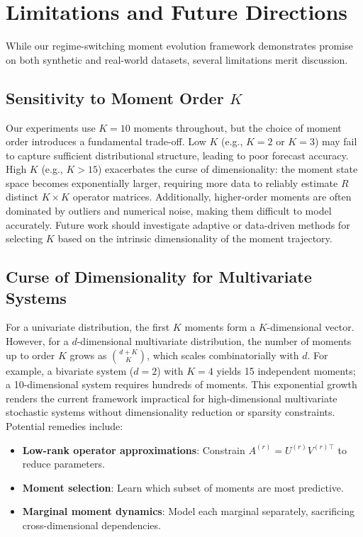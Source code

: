 \documentclass[journal, onecolumn]{IEEEtran}
\begin{document}
\section{Limitations and Future Directions}
\label{sec:limitations}

While our regime-switching moment evolution framework demonstrates promise on both synthetic and real-world datasets, several limitations merit discussion.

\subsection{Sensitivity to Moment Order $K$}

Our experiments use $K=10$ moments throughout, but the choice of moment order introduces a fundamental trade-off. Low $K$ (e.g., $K=2$ or $K=3$) may fail to capture sufficient distributional structure, leading to poor forecast accuracy. High $K$ (e.g., $K > 15$) exacerbates the curse of dimensionality: the moment state space becomes exponentially larger, requiring more data to reliably estimate $R$ distinct $K \times K$ operator matrices. Additionally, higher-order moments are often dominated by outliers and numerical noise, making them difficult to model accurately. Future work should investigate adaptive or data-driven methods for selecting $K$ based on the intrinsic dimensionality of the moment trajectory.

\subsection{Curse of Dimensionality for Multivariate Systems}

For a univariate distribution, the first $K$ moments form a $K$-dimensional vector. However, for a $d$-dimensional multivariate distribution, the number of moments up to order $K$ grows as $\binom{d+K}{K}$, which scales combinatorially with $d$. For example, a bivariate system ($d=2$) with $K=4$ yields 15 independent moments; a 10-dimensional system requires hundreds of moments. This exponential growth renders the current framework impractical for high-dimensional multivariate stochastic systems without dimensionality reduction or sparsity constraints. Potential remedies include:
\begin{itemize}
    \item \textbf{Low-rank operator approximations}: Constrain $A^{(r)} = U^{(r)} V^{(r)\top}$ to reduce parameters.
    \item \textbf{Moment selection}: Learn which subset of moments are most predictive.
    \item \textbf{Marginal moment dynamics}: Model each marginal separately, sacrificing cross-dimensional dependencies.
\end{itemize}
\end{document}

